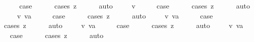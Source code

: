 \begin{isabellebody}
\ \ \isamarkupfalse%
\ \isamarkupfalse%
\ {\isacharquery}case\isanewline
\ \ \ \ \isamarkupfalse%
\ {\isacharparenleft}cases\ z{\isacharparenright}\isanewline
\ \ \ \ \isamarkupfalse%
\ auto\isanewline
{}\isamarkupfalse%
\isanewline
\ \ \isamarkupfalse%
\ {\isacharparenleft}{}{}\ v{\isacharparenright}\isanewline
\ \ \isamarkupfalse%
\ \isamarkupfalse%
\ {\isacharquery}case\isanewline
\ \ \ \ \isamarkupfalse%
\ {\isacharparenleft}cases\ z{\isacharparenright}\isanewline
\ \ \ \ \isamarkupfalse%
\ auto\isanewline
{}\isamarkupfalse%
\isanewline
\ \ \isamarkupfalse%
\ {\isacharparenleft}{}{}\ v\ va{\isacharparenright}\isanewline
\ \ \isamarkupfalse%
\ \isamarkupfalse%
\ {\isacharquery}case\isanewline
\ \ \ \ \isamarkupfalse%
\ {\isacharparenleft}cases\ z{\isacharparenright}\isanewline
\ \ \ \ \isamarkupfalse%
\ auto\isanewline
{}\isamarkupfalse%
\isanewline
\ \ \isamarkupfalse%
\ {\isacharparenleft}{}{}\ v\ va{\isacharparenright}\isanewline
\ \ \isamarkupfalse%
\ \isamarkupfalse%
\ {\isacharquery}case\isanewline
\ \ \ \ \isamarkupfalse%
\ {\isacharparenleft}cases\ z{\isacharparenright}\isanewline
\ \ \ \ \isamarkupfalse%
\ auto\isanewline
{}\isamarkupfalse%
\isanewline
\ \ \isamarkupfalse%
\ {\isacharparenleft}{}{}\ v\ va{\isacharparenright}\isanewline
\ \ \isamarkupfalse%
\ \isamarkupfalse%
\ {\isacharquery}case\isanewline
\ \ \ \ \isamarkupfalse%
\ {\isacharparenleft}cases\ z{\isacharparenright}\isanewline
\ \ \ \ \isamarkupfalse%
\ auto\isanewline
{}\isamarkupfalse%
\isanewline
\ \ \isamarkupfalse%
\ {\isacharparenleft}{\isachardoublequoteopen}{}{}{\isacharunderscore}{}{\isachardoublequoteclose}\ v\ va{\isacharparenright}\isanewline
\ \ \isamarkupfalse%
\ \isamarkupfalse%
\ {\isacharquery}case\isanewline
\ \ \ \ \isamarkupfalse%
\ {\isacharparenleft}cases\ z{\isacharparenright}\isanewline
\ \ \ \ \isamarkupfalse%
\ auto\isanewline
{}\isamarkupfalse%
\isanewline

\end{isabellebody}
